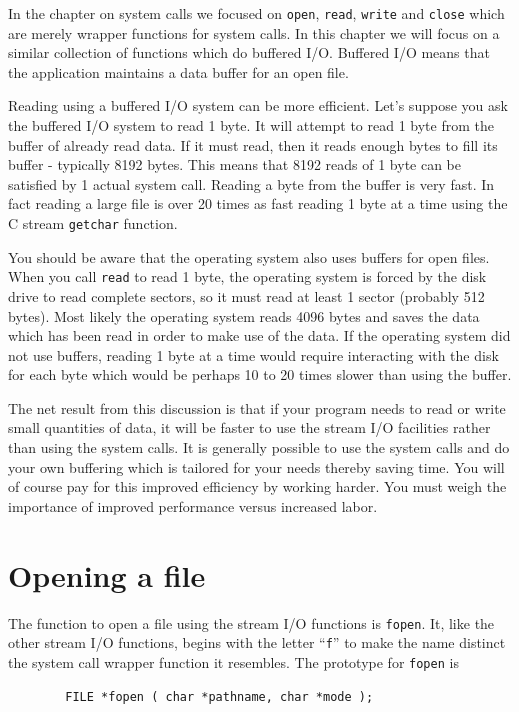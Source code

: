 \documentclass[11pt,b5paper]{book}
\begin{document}
In the chapter on system calls we focused on {\tt open}, {\tt read}, {\tt write} and {\tt close} which are
merely wrapper functions for system calls.
In this chapter we will focus on a similar collection of functions which do buffered I/O.
Buffered I/O means that the application maintains a data buffer for an open file.

Reading using a buffered I/O system can be more efficient.
Let's suppose you ask the buffered I/O system to read 1 byte.
It will attempt to read 1 byte from the buffer of already read data.
If it must read, then it reads enough bytes to fill its buffer - typically 8192 bytes.
This means that 8192 reads of 1 byte can be satisfied by 1 actual system call.
Reading a byte from the buffer is very fast.
In fact reading a large file is over 20 times as fast reading 1 byte at a time using the C stream
{\tt getchar} function.

You should be aware that the operating system also uses buffers for open files.
When you call {\tt read} to read 1 byte, the operating system is forced by the disk drive to read
complete sectors, so it must read at least 1 sector (probably 512 bytes).
Most likely the operating system reads 4096 bytes and saves the data which has been read in order to make
use of the data.
If the operating system did not use buffers, reading 1 byte at a time would require interacting with the
disk for each byte which would be perhaps 10 to 20 times slower than using the buffer.

The net result from this discussion is that if your program needs to read or write small quantities of
data, it will be faster to use the stream I/O facilities rather than using the system calls.
It is generally possible to use the system calls and do your own buffering which is tailored for your
needs thereby saving time.
You will of course pay for this improved efficiency by working harder.
You must weigh the importance of improved performance versus increased labor.

\section{Opening a file}

The function to open a file using the stream I/O functions is {\tt fopen}.
It, like the other stream I/O functions, begins with the letter ``{\tt f}'' to make the
name distinct the system call wrapper function it resembles.
The prototype for {\tt fopen} is
\begin{verbatim}
        FILE *fopen ( char *pathname, char *mode );
\end{verbatim}
\end{document}
